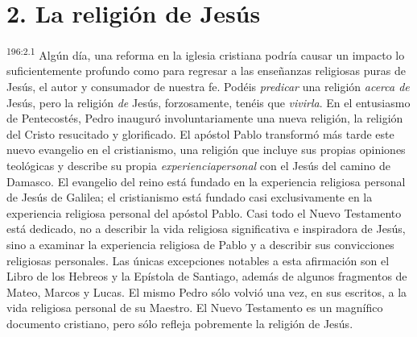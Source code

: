 \section*{2. La religión de Jesús}
\par 
\textsuperscript{196:2.1} Algún día, una reforma en la iglesia cristiana podría causar un impacto lo suficientemente profundo como para regresar a las enseñanzas religiosas puras de Jesús, el autor y consumador de nuestra fe. Podéis \textit{predicar} una religión \textit{acerca de} Jesús, pero la religión \textit{de} Jesús, forzosamente, tenéis que \textit{vivirla}. En el entusiasmo de Pentecostés, Pedro inauguró involuntariamente una nueva religión, la religión del Cristo resucitado y glorificado. El apóstol Pablo transformó más tarde este nuevo evangelio en el cristianismo, una religión que incluye sus propias opiniones teológicas y describe su propia \textit{experienciapersonal} con el Jesús del camino de Damasco. El evangelio del reino está fundado en la experiencia religiosa personal de Jesús de Galilea; el cristianismo está fundado casi exclusivamente en la experiencia religiosa personal del apóstol Pablo. Casi todo el Nuevo Testamento está dedicado, no a describir la vida religiosa significativa e inspiradora de Jesús, sino a examinar la experiencia religiosa de Pablo y a describir sus convicciones religiosas personales. Las únicas excepciones notables a esta afirmación son el Libro de los Hebreos y la Epístola de Santiago, además de algunos fragmentos de Mateo, Marcos y Lucas. El mismo Pedro sólo volvió una vez, en sus escritos, a la vida religiosa personal de su Maestro. El Nuevo Testamento es un magnífico documento cristiano, pero sólo refleja pobremente la religión de Jesús.

